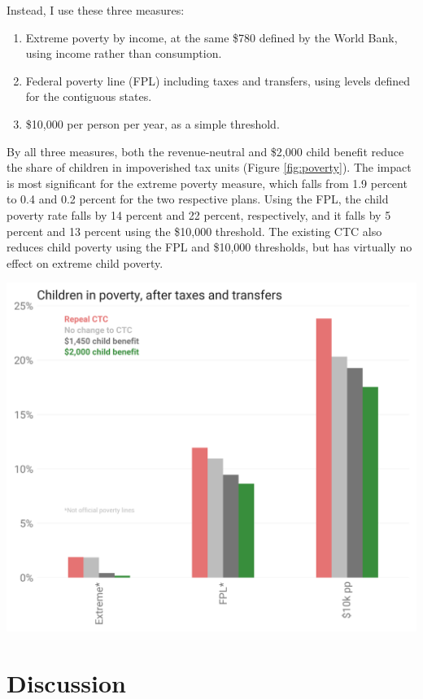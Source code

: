 \documentclass[12pt]{article}
\begin{document}
Instead, I use these three measures:
\begin{enumerate}
\item Extreme poverty by income, at the same \$780 defined by the World Bank, using income rather than consumption.
\item Federal poverty line (FPL) including taxes and transfers, using levels defined for the contiguous states.
\item \$10,000 per person per year, as a simple threshold.
\end{enumerate}

By all three measures, both the revenue-neutral and \$2,000 child benefit reduce the share of children in impoverished tax units (Figure \ref{fig:poverty}). The impact is most significant for the extreme poverty measure, which falls from 1.9 percent to 0.4 and 0.2 percent for the two respective plans. Using the FPL, the child poverty rate falls by 14 percent and 22 percent, respectively, and it falls by 5 percent and 13 percent using the \$10,000 threshold. The existing CTC also reduces child poverty using the FPL and \$10,000 thresholds, but has virtually no effect on extreme child poverty.

\begin{center}
\includegraphics[width=15cm]{poverty.png}
\label{fig:poverty}
\end{center}

\section{Discussion} \label{sec:discussion}
\end{document}
